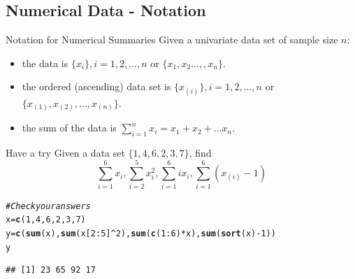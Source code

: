 \documentclass[t,xcolor=pdftex,dvipsnames,table]{beamer}\usepackage[]{graphicx}\usepackage[]{color}
\makeatletter
\newcommand{\hlnum}[1]{\textcolor[rgb]{0.686,0.059,0.569}{#1}}%
\newcommand{\hlcom}[1]{\textcolor[rgb]{0.678,0.584,0.686}{\textit{#1}}}%
\newcommand{\hlopt}[1]{\textcolor[rgb]{0,0,0}{#1}}%
\newcommand{\hlstd}[1]{\textcolor[rgb]{0.345,0.345,0.345}{#1}}%
\newcommand{\hlkwb}[1]{\textcolor[rgb]{0.69,0.353,0.396}{#1}}%
\newcommand{\hlkwd}[1]{\textcolor[rgb]{0.737,0.353,0.396}{\textbf{#1}}}%
\newenvironment{kframe}{%
 \def\at@end@of@kframe{}%
 \ifinner\ifhmode%
  \def\at@end@of@kframe{\end{minipage}}%
  \begin{minipage}{\columnwidth}%
 \fi\fi%
 \def\FrameCommand##1{\hskip\@totalleftmargin \hskip-\fboxsep
 \colorbox{shadecolor}{##1}\hskip-\fboxsep
     \hskip-\linewidth \hskip-\@totalleftmargin \hskip\columnwidth}%
 \MakeFramed {\advance\hsize-\width
   \@totalleftmargin\z@ \linewidth\hsize
   \@setminipage}}%
 {\par\unskip\endMakeFramed%
 \at@end@of@kframe}
\newenvironment{knitrout}{}{} %
\makeatother
\begin{document}
\subsection[]{Numerical Data - Notation}
\begin{frame}{Notation for Numerical Summaries}
Given a univariate data set of sample size $n$:

\begin{itemize}
\item
the data is $ \{ x_i \},i=1,2,\ldots,n$   or  $\{ x_{1},x_{2} \ldots, ,x_{n} \}$. 

\vspace{.5cm}
\item the ordered (ascending) data set is $ \{ x_{(i)} \},i=1,2,\ldots,n$ or 
$\{ x_{(1)},x_{(2)},\ldots,x_{(n)} \}$.

\vspace{.5cm}
\item 
the sum of the data is $\sum_{i=1}^{n} x_i = x_1+ x_2+\ldots x_n$.
\end{itemize}
\end{frame}

\begin{frame}[fragile]{}
\begin{alertblock}{Have a try}
Given a data set $\{ 1,4,6,2,3,7\}$, find
\[ \sum_{i=1}^{6} x_{i},  \sum_{i=2}^{5} x_{i}^2, \sum_{i=1}^{6} i x_{i}, \sum_{i=1}^{6} (x_{(i)}-1) \]
\end{alertblock}

\begin{knitrout}
\color{fgcolor}\begin{kframe}
\begin{alltt}
\hlcom{#Check your answers}
\hlstd{x}\hlkwb{=}\hlkwd{c}\hlstd{(}\hlnum{1}\hlstd{,}\hlnum{4}\hlstd{,}\hlnum{6}\hlstd{,}\hlnum{2}\hlstd{,}\hlnum{3}\hlstd{,}\hlnum{7}\hlstd{)}
\hlstd{y}\hlkwb{=}\hlkwd{c}\hlstd{(}\hlkwd{sum}\hlstd{(x),} \hlkwd{sum}\hlstd{(x[}\hlnum{2}\hlopt{:}\hlnum{5}\hlstd{]}\hlopt{^}\hlnum{2}\hlstd{),} \hlkwd{sum}\hlstd{(}\hlkwd{c}\hlstd{(}\hlnum{1}\hlopt{:}\hlnum{6}\hlstd{)}\hlopt{*}\hlstd{x),} \hlkwd{sum}\hlstd{(}\hlkwd{sort}\hlstd{(x)}\hlopt{-}\hlnum{1}\hlstd{))}
\hlstd{y}
\end{alltt}
\begin{verbatim}
## [1] 23 65 92 17
\end{verbatim}
\end{kframe}
\end{knitrout}
\href{www.mathsisfun.com/algebra/sigma-notation.html}{}
\end{frame}
\end{document}
